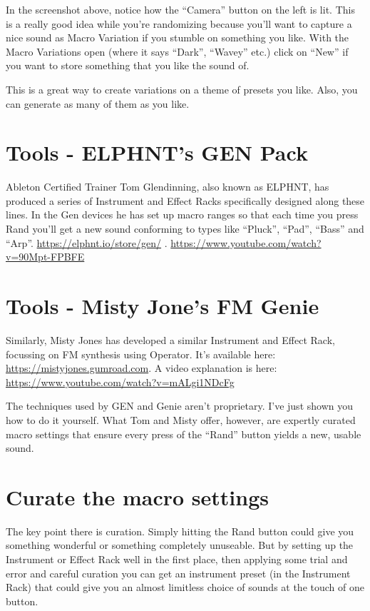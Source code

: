 \documentclass[
  12pt,
  letterpaper,
  oneside,
  open=any]{scrbook}
\begin{document}
In the screenshot above, notice how the ``Camera'' button on the left is
lit. This is a really good idea while you're randomizing because you'll
want to capture a nice sound as Macro Variation if you stumble on
something you like. With the Macro Variations open (where it says
``Dark'', ``Wavey'' etc.) click on ``New'' if you want to store
something that you like the sound of.

This is a great way to create variations on a theme of presets you like.
Also, you can generate as many of them as you like.

\section{Tools - ELPHNT's GEN Pack}\label{tools---elphnts-gen-pack}

Ableton Certified Trainer Tom Glendinning, also known as ELPHNT, has
produced a series of Instrument and Effect Racks specifically designed
along these lines. In the Gen devices he has set up macro ranges so that
each time you press Rand you'll get a new sound conforming to types like
``Pluck'', ``Pad'', ``Bass'' and ``Arp''.
\url{https://elphnt.io/store/gen/} .
\url{https://www.youtube.com/watch?v=90Mpt-FPBFE}

\section{Tools - Misty Jone's FM
Genie}\label{tools---misty-jones-fm-genie}

Similarly, Misty Jones has developed a similar Instrument and Effect
Rack, focussing on FM synthesis using Operator. It's available here:
\url{https://mistyjones.gumroad.com}. A video explanation is here:
\url{https://www.youtube.com/watch?v=mALgi1NDcFg}

The techniques used by GEN and Genie aren't proprietary. I've just shown
you how to do it yourself. What Tom and Misty offer, however, are
expertly curated macro settings that ensure every press of the ``Rand''
button yields a new, usable sound.

\section{Curate the macro settings}\label{curate-the-macro-settings}

The key point there is curation. Simply hitting the Rand button could
give you something wonderful or something completely unuseable. But by
setting up the Instrument or Effect Rack well in the first place, then
applying some trial and error and careful curation you can get an
instrument preset (in the Instrument Rack) that could give you an almost
limitless choice of sounds at the touch of one button.
\end{document}

